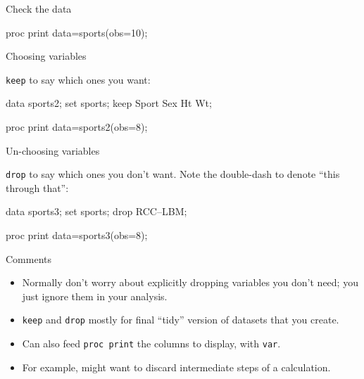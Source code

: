 \documentclass[unknownkeysallowed]{beamer}\usepackage[]{graphicx}\usepackage[]{color}
\begin{document}
\begin{frame}[fragile]{Check the data}
  
  \begin{Sascode}[store=ta]
proc print data=sports(obs=10);    
  \end{Sascode}
  
  
\end{frame}

\begin{frame}[fragile]{Choosing variables}
  
  \texttt{keep} to say which ones you want:

  \begin{Datastep}
data sports2;
  set sports;
  keep Sport Sex Ht Wt;
  \end{Datastep}
  
  \begin{Sascode}[store=tb]
proc print data=sports2(obs=8);
  \end{Sascode}
  
  
\end{frame}


\begin{frame}[fragile]{Un-choosing variables}
  
  \texttt{drop} to say which ones you don't want. Note the double-dash
  to denote ``this through that'':

  \begin{Datastep}
data sports3;
  set sports;
  drop RCC--LBM;
  \end{Datastep}
  
  \begin{Sascode}[store=tc]
    proc print data=sports3(obs=8);
  \end{Sascode}


\end{frame}

\begin{frame}[fragile]{Comments}
  
  \begin{itemize}
  \item Normally don't worry about explicitly dropping variables you
    don't need; you just ignore them in your analysis.
  \item \texttt{keep} and \texttt{drop} mostly for final ``tidy'' version of
    datasets that you create.
  \item Can also feed \texttt{proc print} the columns to display, with
    \texttt{var}. 
  \item For example, might want to discard intermediate steps of a
    calculation. 
  \end{itemize}
  
\end{frame}
\end{document}
